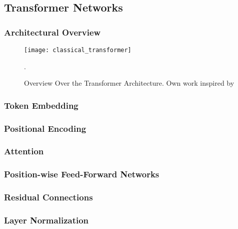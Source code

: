 \subsection{Transformer Networks}\label{sec:transformer-networks}

\subsubsection{Architectural Overview}\label{sec:architectural-overview}

\begin{landscape}
  \begin{figure}
    \begin{center}
      \texttt{[image: classical\_transformer]}
    \end{center}
    \caption[Overview Over the Transformer Architecture]{Overview Over the Transformer Architecture. Own work inspired by \textcite{daiTransformerXLAttentiveLanguage2019}}.
  \end{figure}
\end{landscape}

\subsubsection{Token Embedding}\label{sec:token-embeddings}

\subsubsection{Positional Encoding}\label{sec:positional-encoding}

\subsubsection{Attention}\label{sec:attention}

\subsubsection{Position-wise Feed-Forward Networks}\label{sec:position-wise-ffn}

\subsubsection{Residual Connections}\label{sec:residual-connections}

\subsubsection{Layer Normalization}\label{sec:layer-norm}

